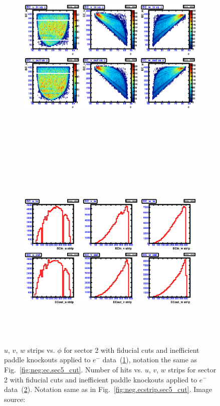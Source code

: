 \begin{figure}[htpb]
  \centering
  \begin{subfigure}[b]{\figwidth}
  \includegraphics[width=\figwidth, height=3.5in,valign=c]{figures/calib/ec/pim_ecuvw_phi_afterGeoFid_sec2.eps}\caption{}\label{fig:EC_III_II}
  \end{subfigure}%
  \\
  \begin{subfigure}[b]{\figwidth}
  \includegraphics[width=\figwidth, height=3.5in,valign=c]{figures/calib/ec/pim_ecuvw_afterGeoFid_sec2.eps}\caption{}\label{fig:EC_IV_II}
  \end{subfigure}%
      \caption { $u$, $v$, $w$ strips vs. $\phi$ for sector 2 with fiducial cuts and inefficient paddle knockouts applied to $e^-$ data~(\ref{fig:EC_III_II}), notation the same as Fig.~\ref{fig:neg:ec.sec5_cut}. Number of hits vs.  $u$, $v$, $w$ strips for sector 2 with fiducial cuts and inefficient paddle knockouts applied to $e^-$ data~(\ref{fig:EC_IV_II}). Notation same as in Fig.~\ref{fig:neg.ecstrip.sec5_cut}. Image source:~\cite{clas.thesis.kunkel}}
        \label{fig:EC_cut_II}
\end{figure}

